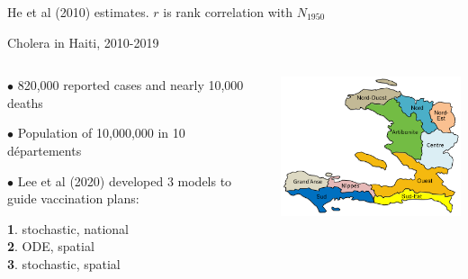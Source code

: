 \documentclass{beamer}
\begin{document}
\begin{frame}{He et al (2010) estimates. $r$ is rank correlation with $N_{1950}$}
\end{frame}


\begin{frame}{Cholera in Haiti, 2010-2019}


  
\begin{columns}[T] %

\begin{column}{.35\textwidth}
  \vspace{5mm}
  
$\bullet$  820,000 reported cases and nearly 10,000 deaths

    \vspace{5mm}

$\bullet$  Population of 10,000,000 in 10 d\'{e}partements

    \vspace{5mm}
    
    $\bullet$  Lee et al (2020) developed 3 models to guide vaccination plans:

    \vspace{1mm}
    
    {\bf 1}. stochastic, national \\
    {\bf 2}. ODE, spatial \\
    {\bf 3}. stochastic, spatial

\end{column}

\begin{column}{.62\textwidth}
  \includegraphics[width=7.5cm]{haiti/haiti.png}


\end{column}
\end{columns}
\end{frame}
\end{document}
